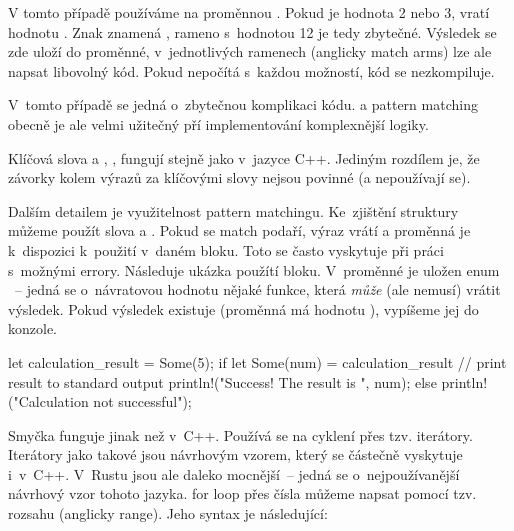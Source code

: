 \documentclass[main.tex]{subfiles}
\begin{document}
V tomto případě používáme  na proměnnou . Pokud je hodnota
2 nebo 3, vratí  hodnotu . Znak \irust{_} znamená
, rameno s~hodnotou 12 je tedy zbytečné. Výsledek se zde uloží do
proměnné, v~jednotlivých ramenech (anglicky match arms) lze ale napsat libovolný kód.
Pokud  nepočítá s~každou možností, kód se nezkompiluje.
\cite[sekce\,8.2.16]{reference}

V~tomto případě se jedná o~zbytečnou komplikaci kódu.  a pattern matching
obecně je ale velmi užitečný pří implementování komplexnější logiky.



Klíčová slova  a , ,  fungují stejně
jako v~jazyce C++. Jediným rozdílem je, že závorky kolem výrazů za klíčovými slovy
nejsou povinné (a nepoužívají se).

Dalším detailem je využitelnost pattern matchingu. Ke~zjištění struktury můžeme použít
slova  a . Pokud se match podaří, výraz vrátí
 a proměnná je k~dispozici k~použití v~daném bloku. Toto se často vyskytuje
při práci s~možnými errory. Následuje ukázka použítí  bloku. V~proměnné
 je uložen enum ~-- jedná se o~návratovou
hodnotu nějaké funkce, která \emph{může} (ale nemusí) vrátit výsledek. Pokud výsledek
existuje (proměnná má hodnotu ), vypíšeme jej do konzole.

\obrazek
\begin{rustcode}
    let calculation_result = Some(5);
    if let Some(num) = calculation_result {
        // print result to standard output
        println!("Success! The result is {}", num);
    } else {
        println!("Calculation not successful");
    }
\end{rustcode}


Smyčka  funguje jinak než v~C++. Používá se na cyklení přes tzv. iterátory.
Iterátory jako takové jsou návrhovým vzorem, který se částečně vyskytuje i~v~C++.
V~Rustu jsou ale daleko mocnější~-- jedná se o~nejpoužívanější návrhový vzor tohoto
jazyka.  for loop přes čísla můžeme napsat pomocí tzv. rozsahu
(anglicky range). Jeho syntax je následující:
\end{document}
